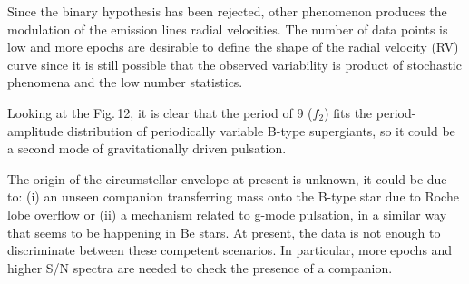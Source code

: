 \documentclass[useAMS,usenatbib]{mn2e}
\begin{document}



Since the binary hypothesis has been rejected, other phenomenon produces the modulation of the emission lines radial velocities.
The number of data points is low and more epochs are desirable to define the shape of the radial velocity (RV) curve since it is still possible that the observed variability is product of stochastic phenomena and the low number statistics.

Looking at the Fig.\,12, it is clear that the period of 9  ($f_2$) fits the period-amplitude distribution of periodically variable B-type supergiants, so it could be a second mode of gravitationally driven pulsation.

 The origin of the circumstellar envelope at present is unknown, it could be due to: (i)  an unseen companion transferring mass onto the B-type star due to Roche lobe overflow or (ii)
a mechanism related to  g-mode pulsation, in a similar way that seems to be happening in Be stars. At present, the data is not enough to discriminate between these competent scenarios. In particular, more epochs and higher S/N spectra are needed to check the presence of a companion.



 

 

\end{document}
